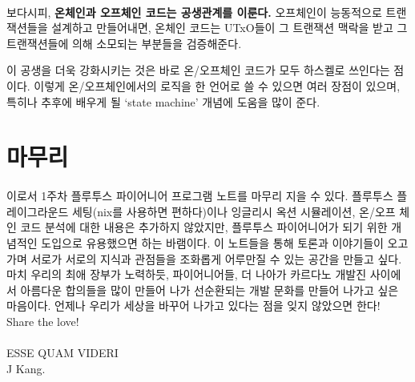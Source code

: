 \documentclass[a4paper, 11pt]{article}
\begin{document}
    \paragraph{} 보다시피, \textbf{온체인과 오프체인 코드는 공생관계를 이룬다.} 오프체인이 능동적으로 트랜잭션들을 설계하고 만들어내면, 온체인 코드는 UTxO들이 그 트랜잭션 맥락을 받고 그 트랜잭션들에 의해 소모되는 부분들을 검증해준다.

    이 공생을 더욱 강화시키는 것은 바로 온/오프체인 코드가 모두 하스켈로 쓰인다는 점이다. 이렇게 온/오프체인에서의 로직을 한 언어로 쓸 수 있으면 여러 장점이 있으며, 특히나 추후에 배우게 될 `state machine' 개념에 도움을 많이 준다.
    
    \section{마무리}

    \paragraph{} 이로서 1주차 플루투스 파이어니어 프로그램 노트를 마무리 지을 수 있다. 플루투스 플레이그라운드 세팅(nix를 사용하면 편하다)이나 잉글리시 옥션 시뮬레이션, 온/오프 체인 코드 분석에 대한 내용은 추가하지 않았지만, 플루투스 파이어니어가 되기 위한 개념적인 도입으로 유용했으면 하는 바램이다. 이 노트들을 통해 토론과 이야기들이 오고가며 서로가 서로의 지식과 관점들을 조화롭게 어루만질 수 있는 공간을 만들고 싶다. 마치 우리의 최애 장부가 노력하듯, 파이어니어들, 더 나아가 카르다노 개발진 사이에서 아름다운 합의들을 많이 만들어 나가 선순환되는 개발 문화를 만들어 나가고 싶은 마음이다. 언제나 우리가 세상을 바꾸어 나가고 있다는 점을 잊지 않았으면 한다! Share the love! \heartsuit 
    
    
    \paragraph{}ESSE QUAM VIDERI\\
    J Kang.
\end{document}
